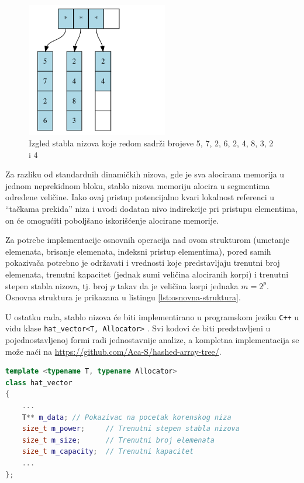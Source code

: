 \documentclass[a4paper]{article}
\begin{document}
\begin{figure}[h!]
    \centering
    \includegraphics[width=0.55\textwidth]{ilustracije/hat-struktura-primer.png}
    \caption{Izgled stabla nizova koje redom sadrži brojeve 5, 7, 2, 6, 2, 4, 8, 3, 2 i 4}
    \label{fig:hat-struktura-primer}
\end{figure}

Za razliku od standardnih dinamičkih nizova, gde je sva alocirana memorija u jednom neprekidnom bloku, stablo nizova memoriju alocira u segmentima određene veličine. Iako ovaj pristup potencijalno kvari lokalnost referenci u \enquote{tačkama prekida} niza i uvodi dodatan nivo indirekcije pri pristupu elementima, on će omogućiti poboljšano iskorišćenje alocirane memorije.

Za potrebe implementacije osnovnih operacija nad ovom strukturom (umetanje elemenata, brisanje elemenata, indeksni pristup elementima), pored samih pokazivača potrebno je održavati i vrednosti koje predstavljaju trenutni broj elemenata, trenutni kapacitet (jednak sumi veličina alociranih korpi) i trenutni stepen stabla nizova, tj. broj $p$ takav da je veličina korpi jednaka $m = 2^p$. Osnovna struktura je prikazana u listingu \ref{lst:osnovna-struktura}.

U ostatku rada, stablo nizova će biti implementirano u programskom jeziku \verb|C++| u vidu klase \verb|hat_vector<T, Allocator>| \cite{hat-implementation}. Svi kodovi će biti predstavljeni u pojednostavljenoj formi radi jednostavnije analize, a kompletna implementacija se može naći na \url{https://github.com/Aca-S/hashed-array-tree/}.

\begin{lstlisting}[language=C++, caption={Osnovna struktura stabla nizova}, captionpos=b, label={lst:osnovna-struktura}]
template <typename T, typename Allocator>
class hat_vector
{
    ...
    T** m_data; // Pokazivac na pocetak korenskog niza
    size_t m_power;     // Trenutni stepen stabla nizova
    size_t m_size;      // Trenutni broj elemenata
    size_t m_capacity;  // Trenutni kapacitet
    ...
};
\end{lstlisting}
\end{document}
